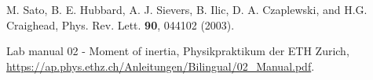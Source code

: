 
\begin{thebibliography}{99}


M. Sato, B. E. Hubbard, A. J. Sievers, B. Ilic, D. A. Czaplewski, and H.G. Craighead, Phys. Rev. Lett. \textbf{90}, 044102 (2003).


Lab manual 02 - Moment of inertia, Physikpraktikum der ETH Zurich,  \url{https://ap.phys.ethz.ch/Anleitungen/Bilingual/02_Manual.pdf}.


\end{thebibliography}
